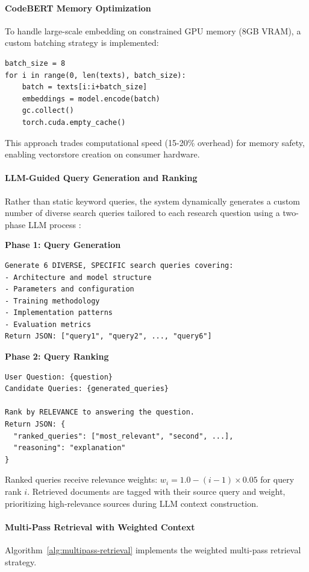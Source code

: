 \paragraph{CodeBERT Memory Optimization}
To handle large-scale embedding on constrained GPU memory (8GB VRAM), a custom batching strategy is implemented:

\begin{verbatim}
batch_size = 8
for i in range(0, len(texts), batch_size):
    batch = texts[i:i+batch_size]
    embeddings = model.encode(batch)
    gc.collect()
    torch.cuda.empty_cache()
\end{verbatim}

This approach trades computational speed (15-20\% overhead) for memory safety, enabling vectorstore creation on consumer hardware.

\paragraph{LLM-Guided Query Generation and Ranking}
Rather than static keyword queries, the system dynamically generates a custom number of diverse search queries tailored to each research question using a two-phase LLM process :

\textbf{Phase 1: Query Generation}
\begin{verbatim}
Generate 6 DIVERSE, SPECIFIC search queries covering:
- Architecture and model structure
- Parameters and configuration
- Training methodology
- Implementation patterns
- Evaluation metrics
Return JSON: ["query1", "query2", ..., "query6"]
\end{verbatim}

\textbf{Phase 2: Query Ranking}
\begin{verbatim}
User Question: {question}
Candidate Queries: {generated_queries}

Rank by RELEVANCE to answering the question.
Return JSON: {
  "ranked_queries": ["most_relevant", "second", ...],
  "reasoning": "explanation"
}
\end{verbatim}

Ranked queries receive relevance weights: \(w_i = 1.0 - (i-1) \times 0.05\) for query rank \(i\). Retrieved documents are tagged with their source query and weight, prioritizing high-relevance sources during LLM context construction.

\paragraph{Multi-Pass Retrieval with Weighted Context}
Algorithm~\ref{alg:multipass-retrieval} implements the weighted multi-pass retrieval strategy.

